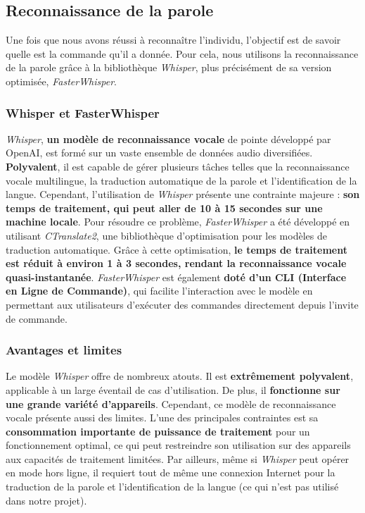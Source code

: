 \subsection{Reconnaissance de la parole}
\label{subsec:Reconnaissance_parole}

Une fois que nous avons réussi à reconnaître l'individu, l'objectif est de
savoir quelle est la commande qu'il a donnée. Pour cela, nous utilisons la
reconnaissance de la parole grâce à la bibliothèque \textit{Whisper}, plus
précisément de sa version optimisée, \textit{FasterWhisper}.

\subsubsection*{Whisper et FasterWhisper}

\textit{Whisper}, \textbf{un modèle de reconnaissance vocale} de pointe développé par OpenAI, est formé sur un vaste ensemble de données audio diversifiées. \textbf{Polyvalent}, il est
capable de gérer plusieurs tâches telles que la reconnaissance vocale multilingue, la traduction automatique de la parole et l'identification de la langue.
Cependant, l'utilisation de \textit{Whisper} présente une contrainte majeure : \textbf{son temps de traitement, qui peut aller de 10 à 15 secondes sur une machine locale}.
Pour résoudre ce problème, \textit{FasterWhisper} a été développé en utilisant
\textit{CTranslate2}, une bibliothèque d'optimisation pour les modèles de
traduction automatique. Grâce à cette optimisation, \textbf{le temps de
	traitement est réduit à environ 1 à 3 secondes, rendant la reconnaissance vocale quasi-instantanée}.
\textit{FasterWhisper} est également \textbf{doté d'un CLI (Interface en Ligne de Commande)}, qui facilite l'interaction avec le modèle en permettant aux utilisateurs d'exécuter des commandes directement depuis
l'invite de commande.

\subsubsection*{Avantages et limites}

Le modèle \textit{Whisper} offre de nombreux atouts. Il est \textbf{extrêmement
	polyvalent}, applicable à un large éventail de cas d'utilisation. De plus, il
\textbf{fonctionne sur une grande variété d'appareils}. Cependant, ce modèle de
reconnaissance vocale présente aussi des limites. L'une des principales
contraintes est sa \textbf{consommation importante de puissance de traitement}
pour un fonctionnement optimal, ce qui peut restreindre son utilisation sur des
appareils aux capacités de traitement limitées. Par ailleurs, même si
\textit{Whisper} peut opérer en mode hors ligne, il requiert tout de même une
connexion Internet pour la traduction de la parole et l'identification de la
langue (ce qui n'est pas utilisé dans notre projet).

